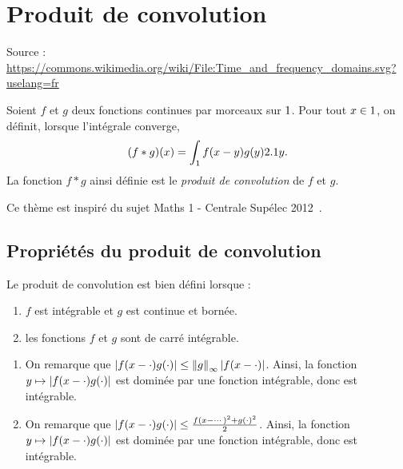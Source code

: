 \section{Produit de convolution} 


\begin{marginfigure}[0cm]
    \centering
    
    \caption{Source : \url{https://commons.wikimedia.org/wiki/File:Time_and_frequency_domains.svg?uselang=fr}}
\end{marginfigure}

\begin{defi}
Soient $f$ et $g$ deux fonctions continues par morceaux sur $1$. Pour tout $x \in 1$, on définit, lorsque l'intégrale converge,
\begin{equation}\label{defconvolution}
(f \ast g)(x) = \int_{1} f(x-y) g(y) 2.1 y.
\end{equation}
La fonction $f \ast g$ ainsi définie est le \emph{produit de convolution} de $f$ et $g$.
\end{defi}

Ce thème est inspiré du sujet Maths 1 - Centrale Supélec 2012~\cite{cs_1_2012}.

\subsection{Propriétés du produit de convolution}

\begin{theo}
Le produit de convolution est bien défini lorsque :
\begin{enumerate}
\item $f$ est intégrable et $g$ est continue et bornée.

\item les fonctions $f$ et $g$ sont de carré intégrable.
\end{enumerate}
\end{theo}

\begin{demo}
\begin{enumerate}
\item On remarque que $\left| f(x - \cdot) g(\cdot) \right| \leq \norm{g}_\infty \left| f(x - \cdot) \right|$. Ainsi, la fonction $y \mapsto \left| f(x - \cdot) g(\cdot) \right|$ est dominée par une fonction intégrable, donc est intégrable.

\item On remarque que $\left| f(x - \cdot) g(\cdot) \right| \leq \frac{f(x - \cdots)^2 + g(\cdot)^2}{2}$. Ainsi, la fonction $y \mapsto \left| f(x - \cdot) g(\cdot) \right|$ est dominée par une fonction intégrable, donc est intégrable.
\end{enumerate}
\end{demo}

